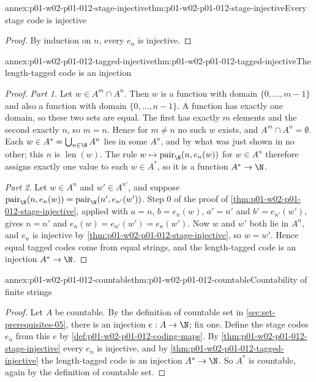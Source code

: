 \begin{annexitem}{annex:p01-w02-p01-012-stage-injective}{thm:p01-w02-p01-012-stage-injective}{Every stage code is injective}
\begin{proof}
By induction on \(n\), every \(e_n\) is injective.
\end{proof}
\end{annexitem}

\begin{annexitem}{annex:p01-w02-p01-012-tagged-injective}{thm:p01-w02-p01-012-tagged-injective}{The length-tagged code is an injection}
\begin{proof}
\emph{Part 1.} Let \(w\in A^m\cap A^n\). Then \(w\) is a function with domain
\(\{0,\ldots,m-1\}\) and also a function with domain \(\{0,\ldots,n-1\}\). A
function has exactly one domain, so these two sets are equal. The first has
exactly \(m\) elements and the second exactly \(n\), so \(m=n\). Hence for
\(m\neq n\) no such \(w\) exists, and \(A^m\cap A^n=\emptyset\). Each
\(w\in A^*=\bigcup_{n\in\N}A^n\) lies in some \(A^n\), and by what was just
shown in no other; this \(n\) is \(\operatorname{len}(w)\). The rule
\(w\mapsto\operatorname{pair}_{\N}(n,e_n(w))\) for \(w\in A^n\) therefore
assigns exactly one value to each \(w\in A^*\), so it is a function
\(A^*\to\N\).

\emph{Part 2.} Let \(w\in A^n\) and \(w'\in A^{n'}\), and suppose
\(\operatorname{pair}_{\N}(n,e_n(w))=\operatorname{pair}_{\N}(n',e_{n'}(w'))\).
Step 0 of the proof of \cref{thm:p01-w02-p01-012-stage-injective}, applied
with \(a=n\), \(b=e_n(w)\), \(a'=n'\) and \(b'=e_{n'}(w')\), gives \(n=n'\)
and \(e_n(w)=e_{n'}(w')=e_n(w')\). Now \(w\) and \(w'\) both lie in \(A^n\),
and \(e_n\) is injective by \cref{thm:p01-w02-p01-012-stage-injective}, so
\(w=w'\). Hence equal tagged codes come from equal strings, and the
length-tagged code is an injection \(A^*\to\N\).
\end{proof}
\end{annexitem}

\begin{annexitem}{annex:p01-w02-p01-012-countable}{thm:p01-w02-p01-012-countable}{Countability of finite strings}
\begin{proof}
Let \(A\) be countable. By the definition of countable set in
\cref{sec:set-prerequisites-05}, there is an injection \(e:A\to\N\); fix one.
Define the stage codes \(e_n\) from this \(e\) by
\cref{def:p01-w02-p01-012-coding-maps}. By
\cref{thm:p01-w02-p01-012-stage-injective} every \(e_n\) is injective, and by
\cref{thm:p01-w02-p01-012-tagged-injective} the length-tagged code is an
injection \(A^*\to\N\). So \(A^*\) is countable, again by the definition of
countable set.
\end{proof}
\end{annexitem}

